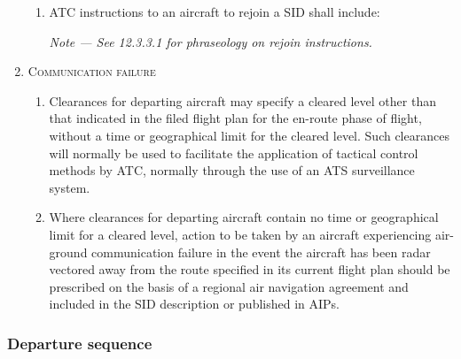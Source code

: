 \documentclass[../main.tex]{subfiles}
\begin{document}
\begin{enumerate}[itemsep=0.2cm]
\begin{enumerate}
            \item ATC instructions to an aircraft to rejoin a SID shall include:

            
            \textit{Note --- See 12.3.3.1 for phraseology on rejoin instructions.}
            
        \end{enumerate}

        \item \textsc{Communication failure}

        \begin{enumerate}
            \item Clearances for departing aircraft may specify a cleared level other than that indicated in the filed flight plan for the en-route phase of flight, without a time or geographical limit for the cleared level. Such clearances will normally be used to facilitate the application of tactical control methods by ATC, normally through the use of an ATS surveillance system.
            \item Where clearances for departing aircraft contain no time or geographical limit for a cleared level, action to be taken by an aircraft experiencing air-ground communication failure in the event the aircraft has been radar vectored away from the route specified in its current flight plan should be prescribed on the basis of a regional air navigation agreement and included in the SID description or published in AIPs.
        \end{enumerate}
    \end{enumerate}

    \subsubsection{Departure sequence}
\end{document}
